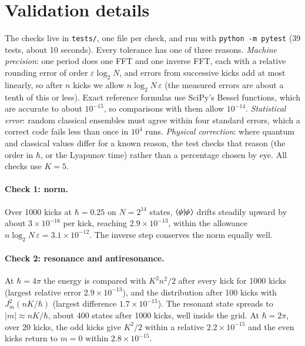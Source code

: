 \section{Validation details}
\label{app:validation}

The checks live in \texttt{tests/}, one file per check, and run with \texttt{python -m pytest} (39 tests, about
10 seconds). Every tolerance has one of three reasons. \emph{Machine precision}: one period does one FFT and one
inverse FFT, each with a relative rounding error of order $\varepsilon\log_2 N$, and errors from successive
kicks add at most linearly, so after $n$ kicks we allow $n\log_2 N\,\varepsilon$ (the measured errors are about
a tenth of this or less). Exact reference formulas use SciPy's Bessel functions, which are accurate to about
$10^{-15}$, so comparisons with them allow $10^{-14}$. \emph{Statistical error}: random classical ensembles
must agree within four standard errors, which a correct code fails less than once in $10^4$ runs.
\emph{Physical correction}: where quantum and classical values differ for a known reason, the test checks
that reason (the order in $\hbar$, or the Lyapunov time) rather than a percentage chosen by eye. All checks use
$K = 5$.

\paragraph{Check 1: norm.}
Over 1000 kicks at $\hbar = 0.25$ on $N = 2^{14}$ states, $\langle \psi|\psi \rangle$ drifts steadily upward by about
$3\times10^{-16}$ per kick, reaching $2.9\times10^{-13}$, within the allowance $n\log_2 N\,\varepsilon =
3.1\times10^{-12}$. The inverse step conserves the norm equally well.

\paragraph{Check 2: resonance and antiresonance.}
At $\hbar = 4\pi$ the energy is compared with $K^2n^2/2$ after every kick for 1000 kicks (largest relative
error $2.9\times10^{-13}$), and the distribution after 100 kicks with $J_m^2(nK/\hbar)$ (largest difference
$1.7\times10^{-15}$). The resonant state spreads to $|m| \approx nK/\hbar$, about 400 states after 1000 kicks,
well inside the grid. At $\hbar = 2\pi$, over 20 kicks, the odd kicks give $K^2/2$ within a relative
$2.2\times10^{-15}$ and the even kicks return to $m = 0$ within $2.8\times10^{-15}$.

